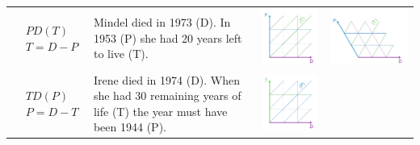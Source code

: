 \documentclass[12pt,oneside,a4paper]{article} %
\begin{document}
\begin{longtable}{m{}L{0.37\textwidth}m{0.17\textwidth}m{0.2\textwidth}}
  $$\begin{aligned}
    &PD(T) \\
    &T = D - P
  \end{aligned}$$ &
  Mindel died in 1973 (D). In 1953 (P) she had 20 years left to live (T). &
  \includegraphics[scale=.5]{Figures/DiagramTable/PD_rt.pdf} &
  \includegraphics[scale=.5]{Figures/DiagramTable/PD_iso.pdf}  \\
  $$\begin{aligned}
    &TD(P) \\
    &P = D - T
  \end{aligned}$$ &
  Irene died in 1974 (D). When she had 30 remaining years of life (T) the year must have been 1944 (P). &
  \includegraphics[scale=.5]{Figures/DiagramTable/TD_rt.pdf} &

\end{longtable}
\end{document}
